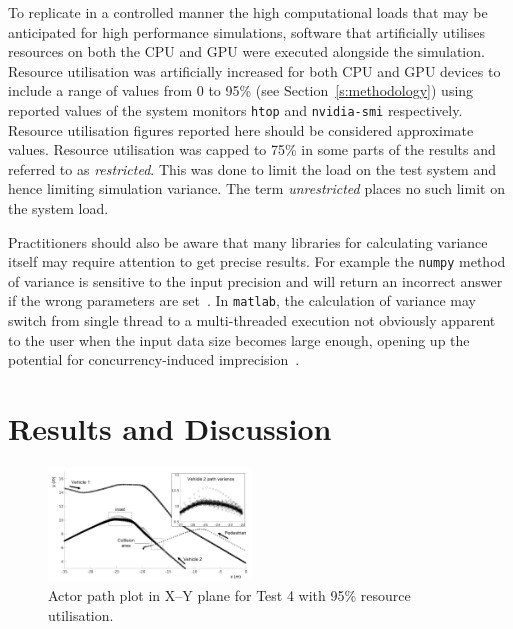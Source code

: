 
\DIFaddend To replicate in a controlled manner the high computational loads that may be anticipated for high performance simulations, software that artificially utilises resources on both the CPU and GPU were executed alongside the simulation. Resource utilisation was artificially increased for both CPU and GPU devices to include a range of values from 0 to 95\% (see Section~\ref{s:methodology}) using reported values of the system monitors \texttt{htop} and \texttt{nvidia-smi} respectively. Resource utilisation figures reported here should be considered approximate values. Resource utilisation was capped to 75\% in some parts of the results and referred to as \textit{restricted}. This was done to limit the load on the test system and hence limiting simulation variance. The term \textit{unrestricted} places no such limit on the system load.

Practitioners should also be aware that many libraries for calculating variance itself may require attention to get precise results. For example the \texttt{numpy} method of variance is sensitive to the input precision and will return an incorrect answer if the wrong parameters are set~\cite{NumpyVar}. In \texttt{matlab}, the calculation of variance may switch from single thread to a multi-threaded execution not obviously apparent to the user when the input data size becomes large enough, opening up the potential for concurrency-induced imprecision~\cite{matlab_parallel_computing}. 


\DIFaddbegin 

\DIFaddend \section{Results and Discussion}\label{s:FinalResultsSection}
\begin{figure}[t]
    \centering
    \includegraphics[width=0.48\textwidth]{../other/figures/actor_path_plot.jpg}
    \caption{Actor path plot in X--Y plane for Test 4 with 95\% resource utilisation.}
    \label{actorPathPlot}
\end{figure}


